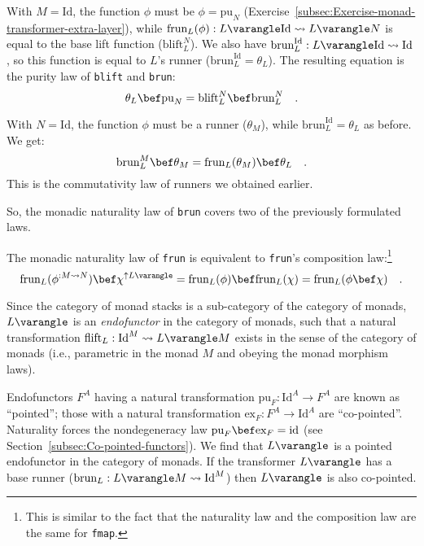 With $M=\text{Id}$, the function $\phi$ must be $\phi=\text{pu}_{N}$
(Exercise~\ref{subsec:Exercise-monad-transformer-extra-layer}),
while $\text{frun}_{L}(\phi):L\varangle\text{Id}\leadsto L\varangle N$
is equal to the base lift function ($\text{blift}_{L}^{N}$). We also
have $\text{brun}_{L}^{\text{Id}}:L\varangle\text{Id}\leadsto\text{Id}$,
so this function is equal to $L$\textsf{'}s runner ($\text{brun}_{L}^{\text{Id}}=\theta_{L}$).
The resulting equation is the purity law of \lstinline!blift! and
\lstinline!brun!:
\[
\theta_{L}\bef\text{pu}_{N}=\text{blift}_{L}^{N}\bef\text{brun}_{L}^{N}\quad.
\]

With $N=\text{Id}$, the function $\phi$ must be a runner ($\theta_{M}$),
while $\text{brun}_{L}^{\text{Id}}=\theta_{L}$ as before. We get:
\[
\text{brun}_{L}^{M}\bef\theta_{M}=\text{frun}_{L}(\theta_{M})\bef\theta_{L}\quad.
\]
This is the commutativity law of runners we obtained earlier.

So, the monadic naturality law of \lstinline!brun! covers two of
the previously formulated laws.

The monadic naturality law of \lstinline!frun! is equivalent to \lstinline!frun!\textsf{'}s
composition law:\footnote{This is similar to the fact that the naturality law and the composition
law are the same for \lstinline!fmap!.}
\[
\text{frun}_{L}(\phi^{:M\leadsto N})\bef\chi^{\uparrow L\varangle}=\text{frun}_{L}(\phi)\bef\text{frun}_{L}(\chi)=\text{frun}_{L}(\phi\bef\chi)\quad.
\]

Since the category of monad stacks is a sub-category of the category
of monads, $L\varangle$ is an \emph{endofunctor}
in the category of monads, such that a natural transformation $\text{flift}_{L}:\text{Id}^{M}\leadsto L\varangle M$
exists in the sense of the category of monads (i.e., parametric in
the monad $M$ and obeying the monad morphism laws). 

Endofunctors $F^{A}$ having a natural transformation $\text{pu}_{F}:\text{Id}^{A}\rightarrow F^{A}$
are known as \textsf{``}pointed\textsf{''};
those with a natural transformation $\text{ex}_{F}:F^{A}\rightarrow\text{Id}^{A}$
are \textsf{``}co-pointed\textsf{''}.
Naturality forces the nondegeneracy law $\text{pu}_{F}\bef\text{ex}_{F}=\text{id}$
(see Section~\ref{subsec:Co-pointed-functors}). We find that $L\varangle$
is a pointed endofunctor in the category of monads. If the transformer
$L\varangle$ has a base runner ($\text{brun}_{L}:L\varangle M\leadsto\text{Id}^{M}$)
then $L\varangle$ is also co-pointed.

